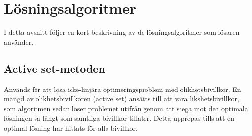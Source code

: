 \section{Lösningsalgoritmer}
I detta avsnitt följer en kort beskrivning av de lösningsalgoritmer som lösaren använder.

\subsection{Active set-metoden}
Används för att lösa icke-linjära optimeringsproblem med olikhetsbivillkor. En mängd av olikhetsbivillkoren (active set) ansätts till att vara likshetsbivillkor, som algoritmen sedan löser problemet utifrån genom att stega mot den optimala lösningen så långt som samtliga bivillkor tillåter. Detta upprepas tills att en optimal lösning har hittats för alla bivillkor.

